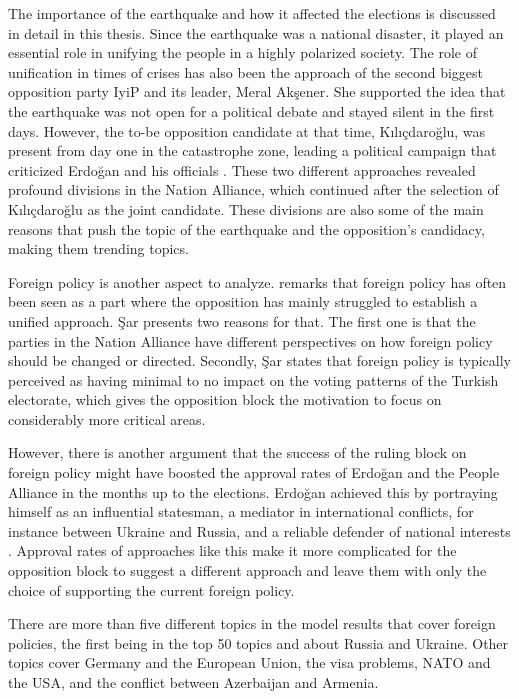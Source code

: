 The importance of the earthquake and how it affected the elections is discussed in detail in this 
thesis. Since the earthquake was a national disaster, it played an essential role in unifying the 
people in a highly polarized society. The role of unification in times of crises has also been the 
approach of the second biggest opposition party \ac{IyiP} and its leader, Meral Akşener. She supported 
the idea that the earthquake was not open for a political debate and stayed silent in the first days. 
However, the to-be opposition candidate at that time, Kılıçdaroğlu, was present from day one in the 
catastrophe zone, leading a political campaign that criticized Erdoğan and his officials
\parencite{cevik_aksoy_turkey_earthquake_2023}. These two different approaches revealed profound 
divi­sions in the Nation Alliance, which continued after the selection of Kılıçdaroğlu as the joint 
candidate. These divisions are also some of the main reasons that push the topic of the earthquake 
and the opposition's candidacy, making them trending topics. 

Foreign policy is another aspect to analyze. \textcite{edgar_sar_opposition_election_agenda_2023} remarks 
that foreign policy has often been seen as a part where the opposition has mainly struggled to 
establish a unified approach. Şar presents two reasons for that. The first one is that the parties in the 
Nation Alliance have different perspectives on how foreign policy should be changed or directed. 
Secondly, Şar states that foreign policy is typically perceived as having minimal to no impact on the 
voting patterns of the Turkish electorate, which gives the opposition block the motivation to focus on 
considerably more critical areas.

However, there is another argument that the success of the ruling block on foreign policy might have 
boosted the approval rates of Erdoğan and the People Alliance in the months up to the elections. 
Erdoğan achieved this by portraying himself as an influential statesman, a mediator in international 
conflicts, for instance between Ukraine and Russia, and a reliable defender of national 
interests \parencite{cevik_aksoy_aydin_turkey_after_elections_2023}. Approval rates of approaches like 
this make it more complicated for the opposition block to suggest a different approach and leave them 
with only the choice of supporting the current foreign policy.

There are more than five different topics in the model results that cover foreign policies, the 
first being in the top 50 topics and about Russia and Ukraine. Other topics cover Germany and the 
European Union, the visa problems, NATO and the USA, and the conflict between Azerbaijan and Armenia.

